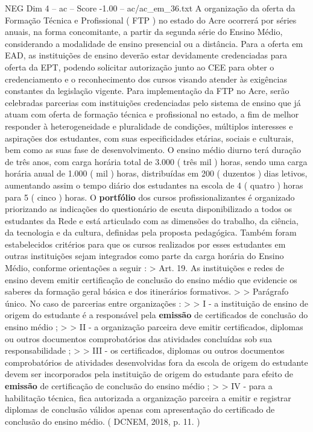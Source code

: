 \begin{textsample}{NEG Dim 4 – ac – Score -1.00 – ac/ac\_em\_36.txt}
A organização da oferta da Formação Técnica e Profissional ( FTP ) no estado do Acre ocorrerá por séries anuais, na forma concomitante, a partir da segunda série do Ensino Médio, considerando a modalidade de ensino presencial ou a distância.
Para a oferta em EAD, as instituições de ensino deverão estar devidamente credenciadas para oferta da EPT, podendo solicitar autorização junto ao CEE para obter o credenciamento e o reconhecimento dos cursos visando atender às exigências constantes da legislação vigente.
Para implementação da FTP no Acre, serão celebradas parcerias com instituições credenciadas pelo sistema de ensino que já atuam com oferta de formação técnica e profissional no estado, a fim de melhor responder à heterogeneidade e pluralidade de condições, múltiplos interesses e aspirações dos estudantes, com suas especificidades etárias, sociais e culturais, bem como as suas fase de desenvolvimento.
O ensino médio diurno terá duração de três anos, com carga horária total de 3.000 ( três mil ) horas, sendo uma carga horária anual de 1.000 ( mil ) horas, distribuídas em 200 ( duzentos ) dias letivos, aumentando assim o tempo diário dos estudantes na escola de 4 ( quatro ) horas para 5 ( cinco ) horas.
O \textbf{portfólio} dos cursos profissionalizantes é organizado priorizando as indicações do questionário de escuta disponibilizado a todos os estudantes da Rede e está articulado com as dimensões do trabalho, da ciência, da tecnologia e da cultura, definidas pela proposta pedagógica.
Também foram estabelecidos critérios para que os cursos realizados por esses estudantes em outras instituições sejam integrados como parte da carga horária do Ensino Médio, conforme orientações a seguir : > Art. 19.
As instituições e redes de ensino devem emitir certificação de conclusão do ensino médio que evidencie os saberes da formação geral básica e dos itinerários formativos. > > Parágrafo único.
No caso de parcerias entre organizações : > > I - a instituição de ensino de origem do estudante é a responsável pela \textbf{emissão} de certificados de conclusão do ensino médio ; > > II - a organização parceira deve emitir certificados, diplomas ou outros documentos comprobatórios das atividades concluídas sob sua responsabilidade ; > > III - os certificados, diplomas ou outros documentos comprobatórios de atividades desenvolvidas fora da escola de origem do estudante devem ser incorporados pela instituição de origem do estudante para efeito de \textbf{emissão} de certificação de conclusão do ensino médio ; > > IV - para a habilitação técnica, fica autorizada a organização parceira a emitir e registrar diplomas de conclusão válidos apenas com apresentação do certificado de conclusão do ensino médio. ( DCNEM, 2018, p. 11. )

\end{textsample}
